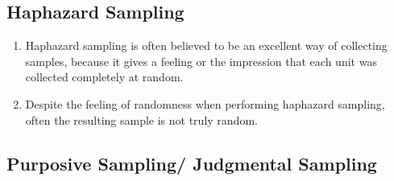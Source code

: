 \subsection{Haphazard Sampling \cite{statistics/book/Statistics-for-Data-Scientists/Maurits-Kaptein}}\label{Sampling Plans/Non-representative Sampling/Haphazard Sampling}

\begin{enumerate}
    \item Haphazard sampling is often believed to be an excellent way of collecting samples, because it gives a feeling or the impression that each unit was collected completely at random.
    \hfill \cite{statistics/book/Statistics-for-Data-Scientists/Maurits-Kaptein}

    \item Despite the feeling of randomness when performing haphazard sampling, often the resulting sample is not truly random.
    \hfill \cite{statistics/book/Statistics-for-Data-Scientists/Maurits-Kaptein}
\end{enumerate}


\subsection{Purposive Sampling/ Judgmental Sampling \cite{statistics/book/Statistics-for-Data-Scientists/Maurits-Kaptein}}\label{Sampling Plans/Non-representative Sampling/Purposive Sampling or Judgmental Sampling}

